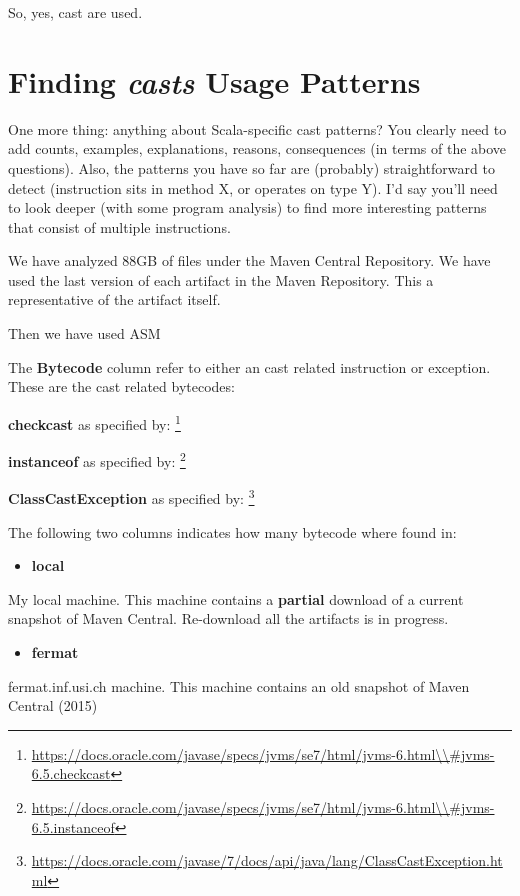 So, yes, cast are used. 

\section{Finding \emph{casts} Usage Patterns \label{org68b50a1}}
\label{sec:orgcd146e1}

One more thing: anything about Scala-specific cast patterns? 
You clearly need to add counts, examples, explanations, reasons, consequences (in terms of the above questions). 
Also, the patterns you have so far are (probably) straightforward to detect (instruction sits in method X, or operates on type Y). 
I'd say you'll need to look deeper (with some program analysis) to find more interesting patterns that consist of multiple instructions. 

We have analyzed 88GB of  files under the Maven Central Repository. 
We have used the last version of each artifact in the Maven Repository. 
This a representative of the artifact itself. 

Then we have used ASM \cite{Bruneton02asm:a} 

The \textbf{Bytecode} column refer to either an cast related instruction or exception. 
These are the cast related bytecodes: 

\textbf{checkcast} as specified by: 
\footnote{\url{https://docs.oracle.com/javase/specs/jvms/se7/html/jvms-6.html\\\#jvms-6.5.checkcast}} 

\textbf{instanceof} as specified by: 
\footnote{\url{https://docs.oracle.com/javase/specs/jvms/se7/html/jvms-6.html\\\#jvms-6.5.instanceof}} 

\textbf{ClassCastException} as specified by: 
\footnote{\url{https://docs.oracle.com/javase/7/docs/api/java/lang/ClassCastException.html}} 

The following two columns indicates how many bytecode where found in: 
\begin{itemize}
\item \textbf{local}
\end{itemize}
My local machine. 
This machine contains a \textbf{partial} download of a current snapshot of Maven Central. 
Re-download all the artifacts is in progress. 
\begin{itemize}
\item \textbf{fermat}
\end{itemize}
fermat.inf.usi.ch machine. 
This machine contains an old snapshot of Maven Central (2015)  

